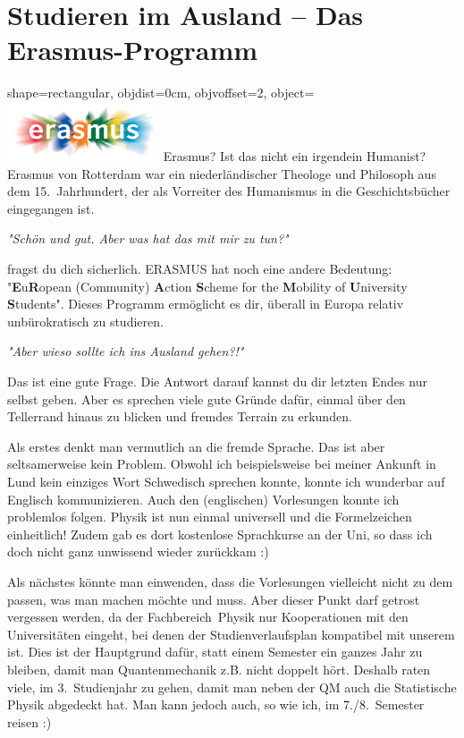 
\enlargethispage{2\baselineskip}
\section{Studieren im Ausland -- Das Erasmus-Programm}
\begin{pullquote}{shape=rectangular, objdist=0cm, objvoffset=2,
object={\includegraphics[width=4.5cm]{res/erasmus.jpg}}}
Erasmus? Ist das nicht ein irgendein Humanist? Erasmus von Rotterdam war ein niederländischer Theologe und Philosoph aus dem 15.~Jahrhundert, der als Vorreiter des Humanismus in die Geschichtsbücher eingegangen ist.

\hspace{1em}\textit{"Schön und gut. Aber was hat das mit mir zu tun?"}

fragst du dich sicherlich. ERASMUS hat noch eine andere Bedeutung: "\textbf{E}u\textbf{R}opean (Community) \textbf{A}ction \textbf{S}cheme for the \textbf{M}obility of \textbf{U}niversity \textbf{S}tudents". Dieses Programm ermöglicht es dir, überall in Europa relativ unbürokratisch zu studieren.

\hspace{1em}\textit{"Aber wieso sollte ich ins Ausland gehen?!"}

Das ist eine gute Frage. Die Antwort darauf kannst du dir letzten Endes nur selbst geben. Aber es sprechen viele gute Gründe dafür, einmal über den Tellerrand hinaus zu blicken und fremdes Terrain zu erkunden.\pullquotenl

Als erstes denkt man vermutlich an die fremde Sprache. Das ist aber seltsamerweise kein Problem. Obwohl ich beispielsweise bei meiner Ankunft in Lund kein einziges Wort Schwedisch sprechen konnte, konnte ich wunderbar auf Englisch kommunizieren. Auch den (englischen) Vorlesungen konnte ich problemlos folgen. Physik ist nun einmal universell und die Formelzeichen einheitlich! Zudem gab es dort kostenlose Sprachkurse an der Uni, so dass ich doch nicht ganz unwissend wieder zurückkam :)\pullquotenl

Als nächstes könnte man einwenden, dass die Vorlesungen vielleicht nicht zu dem passen, was man machen möchte und muss. Aber dieser Punkt darf getrost vergessen werden, da der Fachbereich~Physik nur Kooperationen mit den Universitäten eingeht, bei denen der Studienverlaufsplan kompatibel mit unserem ist. Dies ist der Hauptgrund dafür, statt einem Semester ein ganzes Jahr zu bleiben, damit man Quantenmechanik z.B. nicht doppelt hört. Deshalb raten viele, im 3.~Studienjahr zu gehen, damit man neben der QM auch die Statistische Physik abgedeckt hat. Man kann jedoch auch, so wie ich, im 7./8.~Semester reisen :)\pullquotenl


\end{pullquote}
